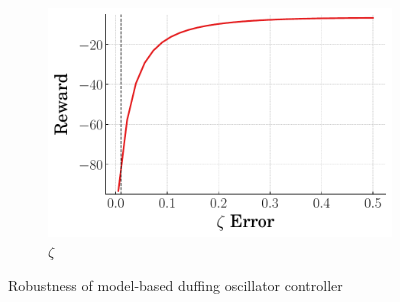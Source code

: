 \begin{figure}[t]
\begin{subfigure}[b]{0.49\textwidth}
        \centering
        \includegraphics[width=\textwidth]{figures/figures_robustness/duffing_robustness/zeta_robustness_fixed_gain.pdf}
        \caption{$\zeta$}
        \label{subfig_chap4:duffing_zeta_robustness_fixed_gain}
    \end{subfigure}
       \caption{Robustness of model-based duffing oscillator controller}
       \label{fig_chap4:duffing_robustness_fixed_gain}
\end{figure}

